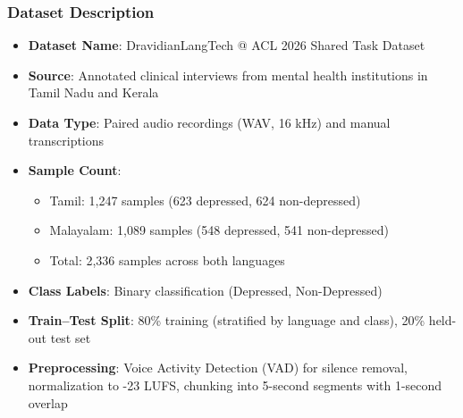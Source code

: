\documentclass{beamer}
\begin{document}
\begin{frame}
\frametitle{Dataset Description}
\begin{itemize}
    \item \textbf{Dataset Name}: DravidianLangTech @ ACL 2026 Shared Task Dataset
    \item \textbf{Source}: Annotated clinical interviews from mental health institutions in Tamil Nadu and Kerala
    \item \textbf{Data Type}: Paired audio recordings (WAV, 16 kHz) and manual transcriptions
    \item \textbf{Sample Count}:
    \begin{itemize}
        \item Tamil: 1,247 samples (623 depressed, 624 non-depressed)
        \item Malayalam: 1,089 samples (548 depressed, 541 non-depressed)
        \item Total: 2,336 samples across both languages
    \end{itemize}
    \item \textbf{Class Labels}: Binary classification (Depressed, Non-Depressed)
    \item \textbf{Train--Test Split}: 80\% training (stratified by language and class), 20\% held-out test set
    \item \textbf{Preprocessing}: Voice Activity Detection (VAD) for silence removal, normalization to -23 LUFS, chunking into 5-second segments with 1-second overlap
\end{itemize}
\end{frame}
\end{document}

